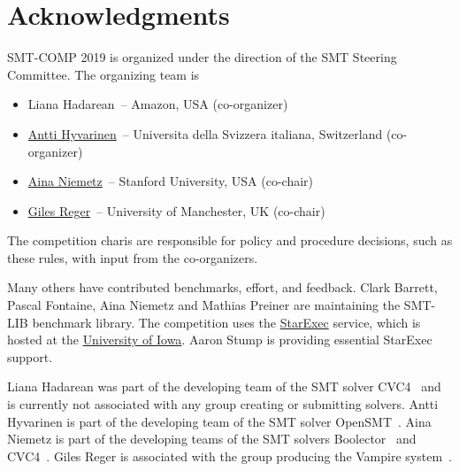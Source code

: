 \documentclass[12pt]{article}
\begin{document}

\pagebreak
\section{Acknowledgments}

SMT-COMP 2019 is organized under the direction of the SMT Steering
Committee. The organizing team is
%
\begin{itemize}
\setlength{\itemsep}{0pt}
\item
		Liana Hadarean~-- Amazon, USA (co-organizer)
\item \href{http://www.inf.usi.ch/postdoc/hyvarinen/}{Antti Hyvarinen}~--
		Universita della Svizzera italiana, Switzerland (co-organizer)
\item
  \href{http://cs.stanford.edu/people/niemetz}{Aina
    Niemetz}~-- Stanford University, USA (co-chair)
\item \href{http://www.cs.man.ac.uk/~regerg/}{Giles Reger}~--
  University of Manchester, UK (co-chair)
\end{itemize}
%
The competition charis are responsible for policy and procedure decisions,
such as these rules, with input from the co-organizers.

Many others have contributed benchmarks, effort, and feedback.  Clark Barrett,
Pascal Fontaine, Aina Niemetz and Mathias Preiner are maintaining the SMT-LIB
benchmark library.
The competition uses the
\href{https://www.starexec.org/}{StarExec} service, which is hosted at
the \href{http://www.cs.uiowa.edu/}{University of Iowa}.  Aaron Stump
is providing essential StarExec support.

%
Liana Hadarean was part of the developing team of the SMT solver
CVC4~\cite{cvc4} and is currently not associated with any group
creating or submitting solvers.
Antti Hyvarinen is part of the developing team of the SMT solver
OpenSMT~\cite{opensmt2}.
Aina Niemetz is part of the developing teams of the SMT solvers
Boolector~\cite{boolector}
and CVC4~\cite{cvc4}.
Giles Reger is associated with the group
producing the Vampire system~\cite{vampire}.





\end{document}
